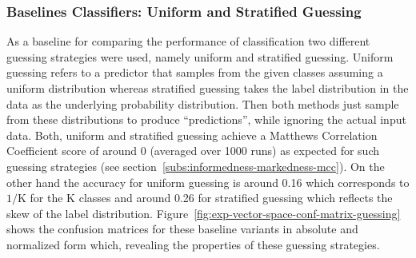 \subsubsection{Baselines Classifiers: Uniform and Stratified Guessing}
\label{subs:baselines-classifiers}

As a baseline for comparing the performance of classification two different guessing strategies were used, namely uniform and stratified guessing.
Uniform guessing refers to a predictor that samples from the given classes assuming a uniform distribution whereas stratified guessing takes the label distribution in the data as the underlying probability distribution.
Then both methods just sample from these distributions to produce ``predictions'', while ignoring the actual input data. Both, uniform and stratified guessing achieve a Matthews Correlation Coefficient score of around 0 (averaged over 1000 runs) as expected for such guessing strategies (see section~\ref{subs:informedness-markedness-mcc}). On the other hand the accuracy for uniform guessing is around 0.16 which corresponds to $1/\text{K}$ for the K classes and around 0.26 for stratified guessing which reflects the skew of the label distribution.
Figure~\ref{fig:exp-vector-space-conf-matrix-guessing} shows the confusion matrices for these baseline variants in absolute and normalized form which, revealing the properties of these guessing strategies.

